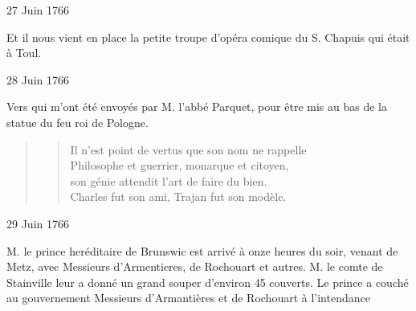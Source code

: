                     \begin{diary}{27 Juin 1766}{}

                         Et il nous vient en place la petite
                           troupe
                           d'opéra comique du S.
                              Chapuis
                           qui était à Toul. \bigskip


                     \end{diary}

                     \begin{diary}{28 Juin 1766}{}

                         Vers qui m'ont été envoyés par
                              M.
                              l'abbé Parquet, pour être mis au bas
                           de la statue du feu roi de
                           Pologne.
                        \bigskip


                        \begin{quote}\begin{verse}Il n'est point de vertus que son nom ne rappelle\\Philosophe et guerrier, monarque et citoyen,\\son génie attendit l'art de faire du bien.\\Charles fut son ami, Trajan fut son modèle.\\\end{verse}
        \bigskip

        \end{quote}
                     \end{diary}
                     \begin{diary}{29 Juin 1766}{}


                           M. le prince heréditaire de
                              Brunswic est
                           arrivé à onze heures du soir, venant de Metz,
                           avec Messieurs
                           d'Armentieres, de Rochouart et
                           autres. M. le comte de
                              Stainville leur a
                           donné un grand souper d'environ 45 couverts.
                           Le prince a couché au gouvernement
                           Messieurs
                           d'Armantières et de Rochouart à l'intendance
                        \bigskip


                     \end{diary}

